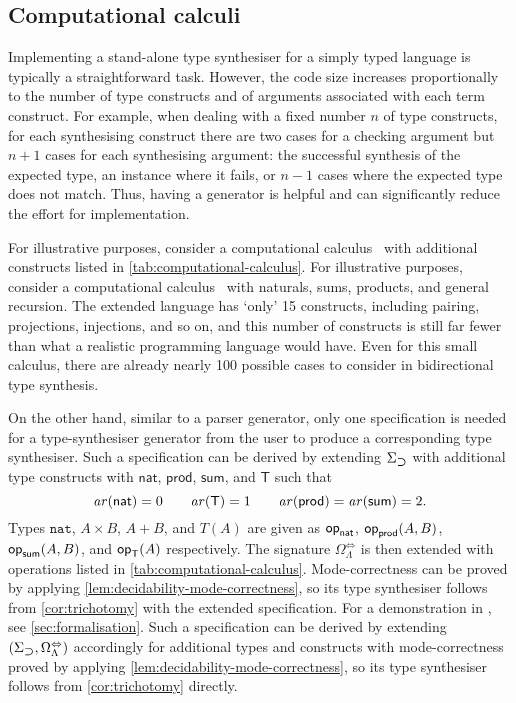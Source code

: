 \subsection{Computational calculi}\label{subsec:PCF}
Implementing a stand-alone type synthesiser for a simply typed language is typically a straightforward task.
However, the code size increases proportionally to the number of type constructs and of arguments associated with each term construct.
For example, when dealing with a fixed number $n$ of type constructs, for each synthesising construct there are two cases for a checking argument but $n + 1$ cases for each synthesising argument: the successful synthesis of the expected type, an instance where it fails, or $n-1$ cases where the expected type does not match.
Thus, having a generator is helpful and can significantly reduce the effort for implementation.

\ifarxiv
For illustrative purposes, consider a computational calculus~\cite{Moggi1989} with additional constructs listed in \cref{tab:computational-calculus}.
\else
For illustrative purposes, consider a computational calculus~\cite{Moggi1989} with naturals, sums, products, and general recursion.
\fi
The extended language has `only' 15 constructs, including pairing, projections, injections, and so on, and this number of constructs is still far fewer than what a realistic programming language would have.
Even for this small calculus, there are already nearly 100 possible cases to consider in bidirectional type synthesis.

On the other hand, similar to a parser generator, only one specification is needed for a type-synthesiser generator from the user to produce a corresponding type synthesiser. 
\ifarxiv
Such a specification can be derived by extending $\Sigma_{\mathbin{\bm{\supset}}}$ with additional type constructs with $\mathsf{nat}$, $\mathsf{prod}$, $\mathsf{sum}$, and $\mathsf{T}$ such that
\[
  \mathit{ar}({\mathsf{nat}}) = 0\qquad
  \mathit{ar}({\mathsf{T}}) = 1\qquad
  \mathit{ar}({\mathsf{prod}}) = \mathit{ar}({\mathsf{sum}}) = 2.
\]
Types $\mathtt{nat}$, $A \times B$, $A + B$, and $T(A)$ are given as $\mathsf{op}_{\mathsf{nat}}$, $\mathsf{op}_{\mathsf{prod}}(A, B)$, $\mathsf{op}_{\mathsf{sum}}(A, B)$, and $\mathsf{op}_{\mathsf{T}}(A)$ respectively.
The signature $\Omega_{\Lambda}^{\Leftrightarrow}$ is then extended with operations listed in \cref{tab:computational-calculus}.
Mode-correctness can be proved by applying \cref{lem:decidability-mode-correctness}, so its type synthesiser follows from \cref{cor:trichotomy} with the extended specification.
For a demonstration in \Agda, see \cref{sec:formalisation}.
\else
Such a specification can be derived by extending $(\Sigma_{\mathbin{\bm{\supset}}}, \Omega_{\Lambda}^{\Leftrightarrow})$ accordingly for additional types and constructs with mode-correctness proved by applying \cref{lem:decidability-mode-correctness}, so its type synthesiser follows from \cref{cor:trichotomy} directly.
\fi
